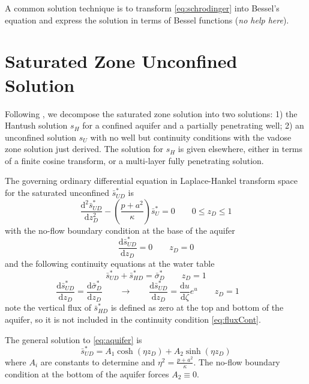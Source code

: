 \documentclass[12pt,letterpaper]{article}
\begin{document}
A common solution technique is to transform \eqref{eq:schrodinger} into Bessel's equation and express the solution in terms of Bessel functions (\textit{no help here}).

\section{Saturated Zone Unconfined Solution}
Following \cite{mishra10}, we decompose the saturated zone solution into two solutions: 1) the Hantush solution $s_H$ for a confined aquifer and a partially penetrating well; 2) an unconfined solution $s_U$ with no well but continuity conditions with the vadose zone solution just derived.  The solution for $s_H$ is given elsewhere, either in terms of a finite cosine transform, or a multi-layer fully penetrating solution.  

The governing ordinary differential equation in Laplace-Hankel
transform space for the saturated unconfined $\bar{s}^{\ast}_{UD}$ is
\begin{equation}
  \label{eq:aquifer}
  \frac{\mathrm{d}^2 \bar{s}_{UD}^{\ast}}{\mathrm{d} z_D^2} - \left( \frac{p + a^2}{\kappa} \right)\bar{s}_U^{\ast} = 0 \qquad 0 \le z_D \le 1
\end{equation}
with the no-flow boundary condition at the base of the aquifer
\begin{equation}\nonumber
 \frac{\mathrm{d} \bar{s}_{UD}^{\ast}}{\mathrm{d} z_D} = 0 \qquad z_D=0 
\end{equation}
and the following continuity equations at the water table
\begin{equation}
  \label{eq:headCont}
  \bar{s}_{UD}^{\ast} + \bar{s}_{HD}^{\ast} = \bar{\sigma}_D^{\ast} \qquad z_D=1
\end{equation}
\begin{equation}
  \label{eq:fluxCont}
  \frac{\mathrm{d} \bar{s}_{UD}^{\ast}}{\mathrm{d} z_D}  = \frac{\mathrm{d}
    \bar{\sigma}_D^{\ast}}{\mathrm{d} z_D} \qquad \rightarrow \qquad \frac{\mathrm{d} \bar{s}_{UD}^{\ast}}{\mathrm{d} z_D}  = \frac{\mathrm{d}u}{\mathrm{d} \zeta} e^u \qquad z_D=1
  \qquad 
\end{equation}
note the vertical flux of $\bar{s}_{HD}^{\ast}$ is defined as zero at
the top and bottom of the aquifer, so it is not included in the
continuity condition \eqref{eq:fluxCont}.

The general solution to \eqref{eq:aquifer} is 
\begin{equation}
  \label{eq:su}
  \bar{s}_{UD}^{\ast} = A_1 \cosh(\eta z_D) + A_2 \sinh(\eta z_D)
\end{equation}
where $A_i$ are constants to determine and $\eta^2 = \frac{p + a^2}{\kappa}$.  The no-flow boundary condition at the bottom of the aquifer forces $A_2\equiv 0$.  
\end{document}
